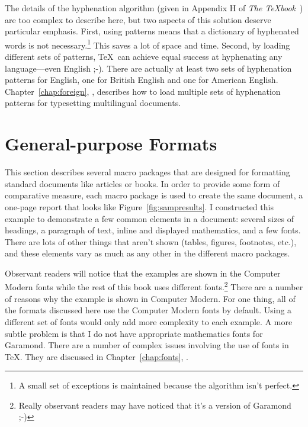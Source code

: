The details of the hyphenation algorithm (given in Appendix H of
\textit{The \TeX{}book}~\cite{kn:texbook}) are too complex to describe
here, but two aspects of this solution deserve particular emphasis.
First, using patterns means that a dictionary of hyphenated words is
not necessary.\footnote{A small set of exceptions is maintained because
the algorithm isn't perfect.}  This saves a lot of space and time.  Second, 
by loading different sets of patterns, \TeX\ can achieve equal success at
hyphenating any language---even English ;-).  There are actually 
at least two sets of hyphenation patterns for English, one for British 
English and one for American English.
Chapter~\ref{chap:foreign}, \textit{}, describes
how to load multiple sets of hyphenation patterns for typesetting
multilingual documents.

\section{General-purpose Formats}

This section describes several macro 
packages  that are designed for
formatting standard documents like articles or books.
In order to provide some form of comparative measure, each macro
package is used to create the same document, a one-page report that looks like
Figure~\ref{fig:sampresults}.  I constructed this example to
demonstrate a few common elements in a document: several sizes of
headings, a paragraph of text, inline and displayed mathematics, and a
few fonts.  There are lots of other things that aren't shown (tables,
figures, footnotes, etc.), and these elements vary as much as any other
in the different macro packages.


%
%
Observant readers will notice that the examples are shown in the Computer
Modern fonts while the rest of this book uses different fonts.\footnote{Really
observant readers may have noticed that it's a version of Garamond ;-)}
There are a number of reasons why the example is shown in Computer Modern.
For one thing, all of the formats discussed here use the Computer Modern fonts
by default.  Using a different set of fonts would only add more
complexity to each example.  A more subtle problem is that I do not have
appropriate mathematics fonts for Garamond.  There are a number of complex
issues involving the use of fonts in \TeX.  They are discussed in
Chapter~\ref{chap:fonts}, {\it {}}.

